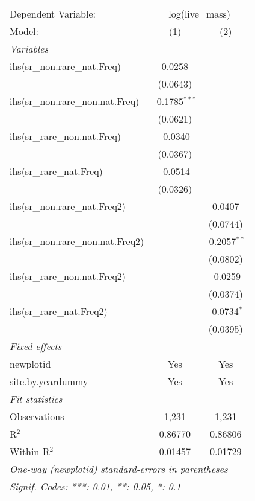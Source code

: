 \begin{tabular}{lcc}
\tabularnewline\midrule\midrule
Dependent Variable:&\multicolumn{2}{c}{log(live\_mass)}\\
Model:&(1) & (2)\\
\midrule \emph{Variables}&   &  \\
ihs(sr\_non.rare\_nat.Freq)&0.0258 &   \\
  &(0.0643) &   \\
ihs(sr\_non.rare\_non.nat.Freq)&-0.1785$^{***}$ &   \\
  &(0.0621) &   \\
ihs(sr\_rare\_non.nat.Freq)&-0.0340 &   \\
  &(0.0367) &   \\
ihs(sr\_rare\_nat.Freq)&-0.0514 &   \\
  &(0.0326) &   \\
ihs(sr\_non.rare\_nat.Freq2)&   & 0.0407\\
  &   & (0.0744)\\
ihs(sr\_non.rare\_non.nat.Freq2)&   & -0.2057$^{**}$\\
  &   & (0.0802)\\
ihs(sr\_rare\_non.nat.Freq2)&   & -0.0259\\
  &   & (0.0374)\\
ihs(sr\_rare\_nat.Freq2)&   & -0.0734$^{*}$\\
  &   & (0.0395)\\
\midrule \emph{Fixed-effects}&   &  \\
newplotid & Yes & Yes\\
site.by.yeardummy & Yes & Yes\\
\midrule \emph{Fit statistics}&  & \\
Observations & 1,231&1,231\\
R$^2$ & 0.86770&0.86806\\
Within R$^2$ & 0.01457&0.01729\\
\midrule\midrule\multicolumn{3}{l}{\emph{One-way (newplotid) standard-errors in parentheses}}\\
\multicolumn{3}{l}{\emph{Signif. Codes: ***: 0.01, **: 0.05, *: 0.1}}\\
\end{tabular}


